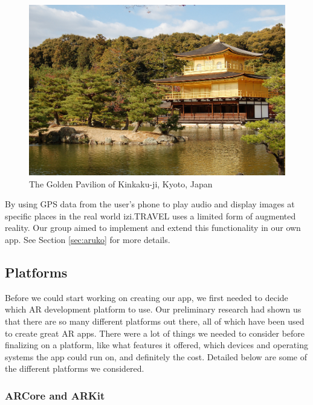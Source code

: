 \documentclass[a4paper, 10pt, american, titlepage]{article}
\begin{document}
\begin{figure}[h]
	\centering
	\includegraphics[width=\textwidth]{kinkakuji.jpg}
	\caption[The Golden Pavilion of Kinkaku-ji, Kyoto, Japan]{The Golden
		Pavilion of Kinkaku-ji, Kyoto, Japan~\autocite{davidson2005}}
	\label{fig:kinkakuji}
\end{figure}

By using GPS data from the user's phone to play audio and display images at
specific places in the real world izi.TRAVEL uses a limited form of augmented
reality. Our group aimed to implement and extend this functionality in our own
app. See Section \ref{sec:aruko} for more details.

\subsection{Platforms}
\label{sec:platforms}

Before we could start working on creating our app, we first needed to decide which
AR development platform to use. Our preliminary research had shown us that there
are so many different platforms out there, all of which have been used to create
great AR apps. There were a lot of things we needed to consider before finalizing
on a platform, like what features it offered, which devices and operating systems the
app could run on, and definitely the cost. Detailed below are some of the different
platforms we considered.

\subsubsection{ARCore and ARKit}
\label{sec:ARCoreAndARKit}
\end{document}
